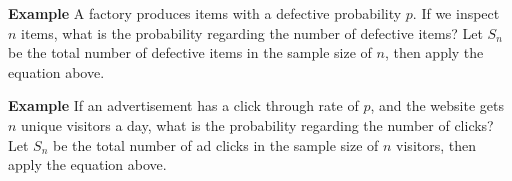 \documentclass[../Probability.tex]{subfiles}
\begin{document}
\medskip
\noindent\textbf{Example} A factory produces items with a defective probability $p$. If we inspect $n$ items, what is the probability regarding the number of defective items?\newline
Let $S_n$ be the total number of defective items in the sample size of $n$, then apply the equation above.

\medskip
\noindent\textbf{Example} If an advertisement has a click through rate of $p$, and the website gets $n$ unique visitors a day, what is the probability regarding the number of clicks?\newline
Let $S_n$ be the total number of ad clicks in the sample size of $n$ visitors, then apply the equation above.
\end{document}
